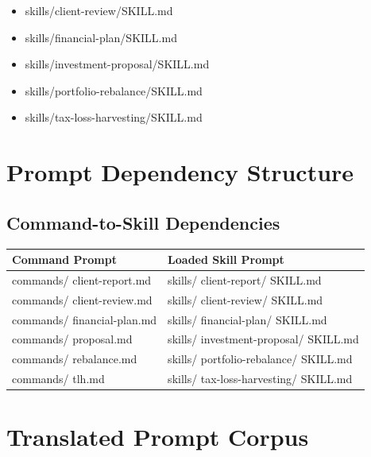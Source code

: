 \documentclass[11pt]{article}
\begin{document}
\begin{itemize}[leftmargin=*,itemsep=1pt,topsep=2pt]
\item \hspace*{1.8em}skills/client-review/SKILL.md
\item \hspace*{1.8em}skills/financial-plan/SKILL.md
\item \hspace*{1.8em}skills/investment-proposal/SKILL.md
\item \hspace*{1.8em}skills/portfolio-rebalance/SKILL.md
\item \hspace*{1.8em}skills/tax-loss-harvesting/SKILL.md
\end{itemize}

\section{Prompt Dependency Structure}

\subsection{Command-to-Skill Dependencies}

\begingroup
\small
\setlength{\tabcolsep}{2pt}
\begin{longtable}{>{\RaggedRight\arraybackslash\hspace{0pt}}p{}>{\RaggedRight\arraybackslash\hspace{0pt}}p{}}
\toprule
{} \textbf{Command Prompt} & \textbf{Loaded Skill Prompt} \\
\midrule
{} commands/ client-report.md & skills/ client-report/ SKILL.md \\
{} commands/ client-review.md & skills/ client-review/ SKILL.md \\
{} commands/ financial-plan.md & skills/ financial-plan/ SKILL.md \\
{} commands/ proposal.md & skills/ investment-proposal/ SKILL.md \\
{} commands/ rebalance.md & skills/ portfolio-rebalance/ SKILL.md \\
{} commands/ tlh.md & skills/ tax-loss-harvesting/ SKILL.md \\
\bottomrule
\end{longtable}
\endgroup

\newpage

\section{Translated Prompt Corpus}
\end{document}
